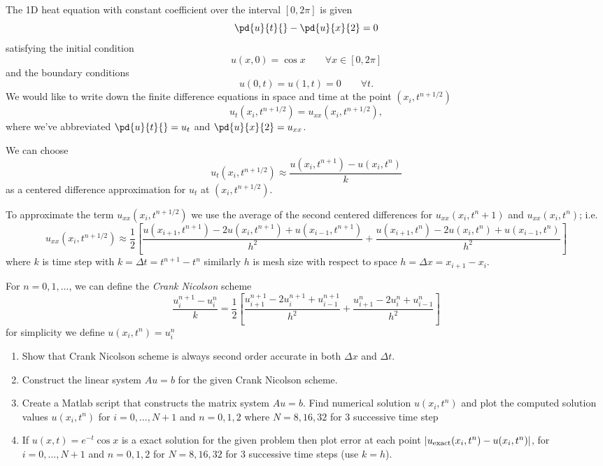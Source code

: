 The 1D  heat equation with constant coefficient over the interval $[0,2\pi]$ is given 
\[
\pd{u}{t}{}-\pd{u}{x}{2} = 0
\]
satisfying the initial condition \[u(x,0)=\cos x \qquad \forall x\in[0,2\pi]\]
and the boundary conditions
\[
u(0,t) = u(1,t) = 0\qquad \forall t.
\] 
We would like to write down the finite difference equations in space and time at the point $(x_i,t^{n+ 1/2})$
\[
u_t(x_i,t^{n+ 1/2}) = u_{xx}(x_i,t^{n+ 1/2}),
\]
where we've abbreviated $\pd{u}{t}{} = u_t$ and $\pd{u}{x}{2} = u_{xx}$.  

We can choose
\[
u_t(x_i,t^{n+ 1/2})\approx \frac{u(x_i,t^{n+ 1})-u(x_i,t^{n})}{k}
\] 
as a centered difference approximation for $u_t$ at $(x_i,t^{n+ 1/2})$.  

To approximate the term $u_{xx}(x_i,t^{n+ 1/2} )$ we use the average of the second centered differences for $u_{xx}(x_i,t^n+1)$ and $u_{xx}(x_i,t^n)$; i.e.
\[
u_{xx}(x_i,t^{n+ 1/2} ) \approx \frac{1}{2}\left[\frac{u(x_{i+1},t^{n+1}) - 2u(x_i,t^{n+1}) + u(x_{i-1},t^{n+1})}{h^2} + \frac{u(x_{i+1},t^{n}) - 2u(x_i,t^{n}) + u(x_{i-1},t^{n})}{h^2}\right]
\]
where $k$ is time step with $k=\Delta t = t^{n+1}-t^n$ similarly $h$ is mesh size with respect to space $h=\Delta x = x_{i+1}-x_i$.

For $n=0,1,\ldots$, we can define the \textit{Crank Nicolson} scheme
\[
\frac{u_i^{n+ 1}-u_i^{n}}{k} = \frac{1}{2}\left[\frac{u_{i+1}^{n+1} - 2u_i^{n+1} + u_{i-1}^{n+1}}{h^2} + \frac{u_{i+1}^{n} - 2u_i^{n} + u_{i-1}^{n}}{h^2}\right]
\] for simplicity we define $u(x_i,t^n)=u_i^n$

\begin{enumerate}
\item Show that  Crank Nicolson scheme is always second order accurate in both $\Delta x $ and $\Delta t$. 
\item Construct the linear system $Au=b$ for the given Crank Nicolson scheme.
\item Create a Matlab script that constructs the matrix system $Au = b$. Find numerical solution $u(x_i,t^n)$ and  plot the computed solution values $u(x_i,t^n)$ for $i = 0, . . . , N + 1$ and $n=0,1,2$ where $N = 8, 16, 32$ for $3$ successive time step

\item If $u(x,t)=e^{-t} \cos x$  is a exact solution for the given problem then plot  error at each point $|u_{\rm exact}(x_i,t^n) - u(x_i,t^n)|$, for $i = 0, . . . , N + 1$ and $n=0,1,2$ for $N = 8, 16, 32$ for $3$ successive time steps (use $k = h$).


\end{enumerate}

